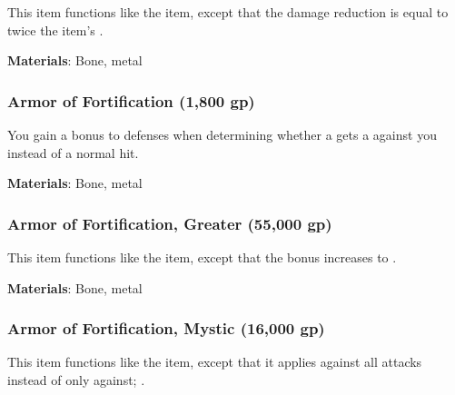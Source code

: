 This item functions like the  item, except that the damage reduction is equal to twice the item's .



\vspace{0.25em}
\textbf{Materials}: Bone, metal


\lowercase{\hypertarget{item:Armor of Fortification}{}}\label{item:Armor of Fortification}
\hypertarget{item:Armor of Fortification}{\subsubsection{Armor of Fortification\hfill{} (1,800 gp)}}

You gain a  bonus to defenses when determining whether a  gets a  against you instead of a normal hit.



\vspace{0.25em}
\textbf{Materials}: Bone, metal


\lowercase{\hypertarget{item:Armor of Fortification, Greater}{}}\label{item:Armor of Fortification, Greater}
\hypertarget{item:Armor of Fortification, Greater}{\subsubsection{Armor of Fortification, Greater\hfill{} (55,000 gp)}}

This item functions like the  item, except that the bonus increases to .



\vspace{0.25em}
\textbf{Materials}: Bone, metal


\lowercase{\hypertarget{item:Armor of Fortification, Mystic}{}}\label{item:Armor of Fortification, Mystic}
\hypertarget{item:Armor of Fortification, Mystic}{\subsubsection{Armor of Fortification, Mystic\hfill{} (16,000 gp)}}

This item functions like the  item, except that it applies against all attacks instead of only against; .



